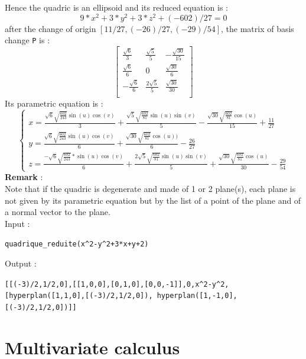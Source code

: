 \documentclass[a4paper,11pt]{book}
\begin{document}
Hence the quadric is an ellipsoid and its reduced equation is :
\[ 9*x^2+3*y^2+3*z^2+(-602)/27 = 0\]
after the change of origin $[11/27,(-26)/27,(-29)/54]$,
the matrix of basis change {\tt P} is :
\[ \left[
\begin{array}{ccc}
\displaystyle \frac{\sqrt 6}{3} & \displaystyle\frac{\sqrt 5}{5} & \displaystyle-\frac{\sqrt{30}}{15}\\
\displaystyle \frac{\sqrt 6}{6} & 0 & \displaystyle \frac{\sqrt{30}}{6}\\
\displaystyle -\frac{\sqrt 6}{6} & \displaystyle \frac{2\sqrt{5}}{5} & \displaystyle \frac{\sqrt{30}}{30}\\
\end{array}
\right] \]
Its parametric equation is :
\[ \left\{
\begin{array}{l}
x =\displaystyle \frac{\sqrt 6\sqrt{\frac{602}{243}}\sin(u)\cos(v)}{3}+\frac{\sqrt 5\sqrt{\frac{602}{81}}\sin(u)\sin(v)}{5}-\frac{\sqrt{30}\sqrt{\frac{602}{81}}\cos(u)}{15}+\frac{11}{27}\\
y =\displaystyle \frac{\sqrt 6\sqrt{\frac{602}{243}}\sin(u)\cos(v)}{6}+\frac{\sqrt{30}\sqrt{\frac{602}{81}}\cos(u))}{6}-\frac{26}{27}\\
z =\displaystyle \frac{-\sqrt 6\sqrt{\frac{602}{243}}*\sin(u)\cos(v)}{6}+\frac{2\sqrt 5\sqrt{\frac{602}{81}}\sin(u)\sin(v)}{5}+\frac{\sqrt{30}\sqrt{\frac{602}{81}}\cos(u)}{30}-\frac{29}{54}
\end{array}
\right. 
\]
{\bf Remark} :\\
Note that if the quadric is degenerate and made of 1 or 2 plane(s), 
each plane is not given by 
its parametric equation but by the list of a point of the plane
and of a normal vector to the plane.\\ 
Input :
\begin{center}{\tt quadrique\_reduite(x\verb|^|2-y\verb|^|2+3*x+y+2)}\end{center}
Output :
\begin{center}{\tt [[(-3)/2,1/2,0],[[1,0,0],[0,1,0],[0,0,-1]],0,x\verb|^|2-y\verb|^|2, [hyperplan([1,1,0],[(-3)/2,1/2,0]), hyperplan([1,-1,0],[(-3)/2,1/2,0])]]}\end{center}

 \section{Multivariate calculus}\label{sec:plusvar}
\end{document}
